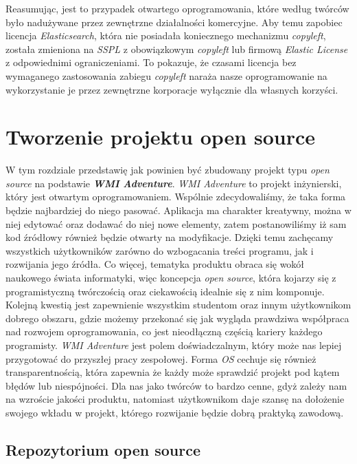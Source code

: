 \documentclass{article}
\begin{document}
Reasumując, jest to przypadek otwartego oprogramowania, które według twórców było nadużywane przez zewnętrzne działalności komercyjne. Aby temu zapobiec licencja \emph{Elasticsearch}, która nie posiadała koniecznego mechanizmu \emph{copyleft}, została zmieniona na \emph{SSPL} z obowiązkowym \emph{copyleft} lub firmową \emph{Elastic License} z odpowiednimi ograniczeniami. To pokazuje, że czasami licencja bez wymaganego zastosowania zabiegu \emph{copyleft} naraża nasze oprogramowanie na wykorzystanie je przez zewnętrzne korporacje wyłącznie dla własnych korzyści. 

\section{Tworzenie projektu open source}

\hspace{4mm} W tym rozdziale przedstawię jak powinien być zbudowany projekt typu \emph{open source} na podstawie \textbf{\emph{WMI Adventure}}. \emph{WMI Adventure} to projekt inżynierski, który jest otwartym oprogramowaniem. Wspólnie zdecydowaliśmy, że taka forma będzie najbardziej do niego pasować. Aplikacja ma charakter kreatywny, można w niej edytować oraz dodawać do niej nowe elementy, zatem postanowiliśmy iż sam kod źródłowy również będzie otwarty na modyfikacje. Dzięki temu zachęcamy wszystkich użytkowników zarówno do wzbogacania treści programu, jak i rozwijania jego źródła. Co więcej, tematyka produktu obraca się wokół naukowego świata informatyki, więc koncepcja \emph{open source}, która kojarzy się z programistyczną twórczością oraz ciekawością idealnie się z nim komponuje. Kolejną kwestią jest zapewnienie wszystkim studentom oraz innym użytkownikom dobrego obszaru, gdzie możemy przekonać się jak wygląda prawdziwa współpraca nad rozwojem oprogramowania, co jest nieodłączną częścią kariery każdego programisty. \emph{WMI Adventure} jest polem doświadczalnym, który może nas lepiej przygotować do przyszłej pracy zespołowej. Forma \emph{OS} cechuje się również transparentnością, która zapewnia że każdy może sprawdzić projekt pod kątem błędów lub niespójności. Dla nas jako twórców to bardzo cenne, gdyż zależy nam na wzroście jakości produktu, natomiast użytkownikom daje szansę na dołożenie swojego wkładu w projekt, którego rozwijanie będzie dobrą praktyką zawodową.

\subsection{Repozytorium open source}
\end{document}

